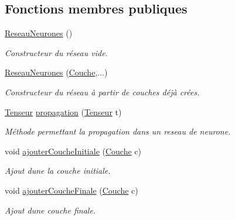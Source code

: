 \subsection*{Fonctions membres publiques}
\begin{DoxyCompactItemize}
\item 
\mbox{\label{class_reseau_neurones_aaeb64d6dcc72efb8dd3a2ab46e548ffa}} 
\hyperlink{class_reseau_neurones_aaeb64d6dcc72efb8dd3a2ab46e548ffa}{Reseau\+Neurones} ()
\begin{DoxyCompactList}\small\item\em Constructeur du réseau vide. \end{DoxyCompactList}\item 
\mbox{\label{class_reseau_neurones_aa7c75b3511f748811e9cbd4643ae27e4}} 
\hyperlink{class_reseau_neurones_aa7c75b3511f748811e9cbd4643ae27e4}{Reseau\+Neurones} (\hyperlink{class_couche}{Couche},...)
\begin{DoxyCompactList}\small\item\em Constructeur du réseau à partir de couches déjà crées. \end{DoxyCompactList}\item 
\hyperlink{class_tenseur}{Tenseur} \hyperlink{class_reseau_neurones_a7079f7694f0369187b8ff28cefcbc5eb}{propagation} (\hyperlink{class_tenseur}{Tenseur} t)
\begin{DoxyCompactList}\small\item\em Méthode permettant la propagation dans un reseau de neurone. \end{DoxyCompactList}\item 
void \hyperlink{class_reseau_neurones_a21335ab1fa9c375290cb36cb06d77c79}{ajouter\+Couche\+Initiale} (\hyperlink{class_couche}{Couche} c)
\begin{DoxyCompactList}\small\item\em Ajout d\textquotesingle{}une la couche initiale. \end{DoxyCompactList}\item 
void \hyperlink{class_reseau_neurones_a8802f175e367ecd5ab3ad2d4d5b91058}{ajouter\+Couche\+Finale} (\hyperlink{class_couche}{Couche} c)
\begin{DoxyCompactList}\small\item\em Ajout d\textquotesingle{}une couche finale. \end{DoxyCompactList}\item 

\end{DoxyCompactItemize}
